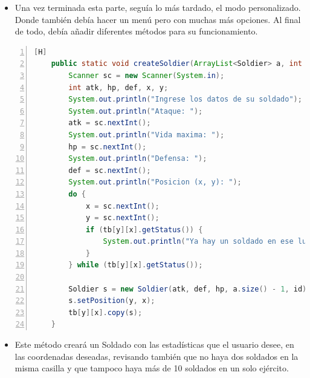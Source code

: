 \documentclass{article}
\begin{document}
	\begin{itemize}	
		\item Una vez terminada esta parte, seguía lo más tardado, el modo personalizado. Donde también debía hacer un menú pero con muchas más opciones. Al final de todo, debía añadir diferentes métodos para su funcionamiento.
	\end{itemize}
	
	\begin{lstlisting}[language=java,caption={Método Create Soldier}, numbers=left][H]
	public static void createSoldier(ArrayList<Soldier> a, int id, Soldier[][] tb) {
        Scanner sc = new Scanner(System.in);
        int atk, hp, def, x, y;
        System.out.println("Ingrese los datos de su soldado");
        System.out.println("Ataque: ");
        atk = sc.nextInt();
        System.out.println("Vida maxima: ");
        hp = sc.nextInt();
        System.out.println("Defensa: ");
        def = sc.nextInt();
        System.out.println("Posicion (x, y): ");
        do {
            x = sc.nextInt();
            y = sc.nextInt();
            if (tb[y][x].getStatus()) {
                System.out.println("Ya hay un soldado en ese lugar!");
            }
        } while (tb[y][x].getStatus());

        Soldier s = new Soldier(atk, def, hp, a.size() - 1, id);
        s.setPosition(y, x);
        tb[y][x].copy(s);
    }
	\end{lstlisting}
	\begin{itemize}	
		\item Este método creará un Soldado con las estadísticas que el usuario desee, en las coordenadas deseadas, revisando también que no haya dos soldados en la misma casilla y que tampoco haya más de 10 soldados en un solo ejército.
	\end{itemize}
	
\end{document}
